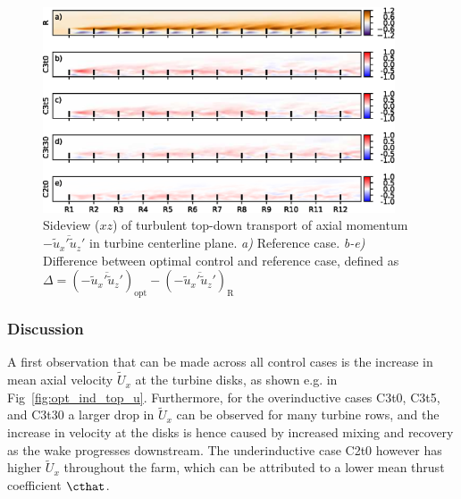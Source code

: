 	\begin{figure}[hb!]
		\centering
		\includegraphics[width=0.93\textwidth]{chapters/optimal_induction_control/sideview_uw.eps}
		\caption[Sideview ($xz$) of turbulent top-down transport of axial momentum $- \overline{\widetilde{u}_x'\widetilde{u}_z'}$ in turbine centerline plane.]{Sideview ($xz$) of turbulent top-down transport of axial momentum $- \overline{\widetilde{u}_x'\widetilde{u}_z'}$ in turbine centerline plane. \emph{a) } Reference case. \emph{b-e)} Difference between optimal control and reference case, defined as $\Delta = (- \overline{\widetilde{u}_x'\widetilde{u}_z'})_{\text{opt}} - (- \overline{\widetilde{u}_x'\widetilde{u}_z'})_{\text{R}}$  \label{fig:opt_ind_side_uw}}
	\end{figure}	

	\subsubsection{Discussion}
	 A first observation that can be made across all control cases is the increase in mean axial velocity $\widetilde{U}_x$ at the turbine disks, as shown e.g. in Fig~\ref{fig:opt_ind_top_u}. Furthermore, for the overinductive cases C3t0, C3t5, and C3t30 a larger drop in $\widetilde{U}_x$ can be observed for many turbine rows, and the increase in velocity at the disks is hence caused by increased mixing and recovery as the wake progresses downstream. The underinductive case C2t0 however has higher $\widetilde{U}_x$ throughout the farm, which can be attributed to a lower mean thrust coefficient $\cthat$. 
	 
